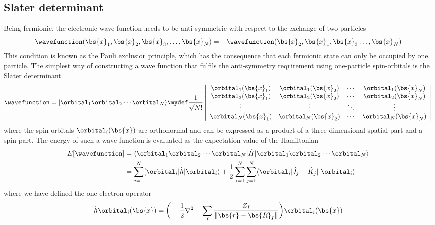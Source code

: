 \subsection{Slater determinant}
Being fermionic, the electronic wave function needs to be anti-symmetric with respect to 
the exchange of two particles
\begin{equation}
    \wavefunction(\bs{x}_1,\bs{x}_2,\bs{x}_3,\dots,\bs{x}_N) = -
    \wavefunction(\bs{x}_2,\bs{x}_1,\bs{x}_3\dots,\bs{x}_N)
\end{equation}
This condition is known as the Pauli exclusion principle\cite{Pauli_princ}, which has the 
consequence that each fermionic state can only be occupied by one particle. The simplest way
of constructing a wave function that fulfils the anti-symmetry requirement using one-particle
spin-orbitals is the Slater determinant\cite{slater}
\begin{equation}
    \begin{split}
    \wavefunction = |\orbital_1\orbital_2\cdots\orbital_N\rangle \mydef \frac{1}{\sqrt{N!}} 
    \left|
    \begin{array}{cccc}
	\orbital_1(\bs{x}_1)	& \orbital_1(\bs{x}_2)	& \cdots & \orbital_1(\bs{x}_N)\\
	\orbital_2(\bs{x}_1)	& \orbital_2(\bs{x}_2)	& \cdots & \orbital_2(\bs{x}_N)\\
	\vdots			& \vdots		& \ddots & \vdots\\
	\orbital_N(\bs{x}_1)	& \orbital_N(\bs{x}_2)	& \cdots & \orbital_N(\bs{x}_N)
    \end{array}
    \right|
    \end{split}
\end{equation}
where the spin-orbitals $\orbital_i(\bs{x})$ are orthonormal and can be expressed as a product 
of a three-dimensional spatial part and a spin part. The energy of such a wave function is 
evaluated as the expectation value of the Hamiltonian
\begin{align}
    E[\wavefunction] 
	&= \langle\orbital_1\orbital_2\cdots\orbital_N|\hat{H}|
	\orbital_1\orbital_2\cdots\orbital_N\rangle\\
	&= \sum_{i=1}^N \langle \orbital_i |\hat{h}| \orbital_i \rangle +
	\frac{1}{2} \sum_{i=1}^N \sum_{j=1}^N
	\langle \orbital_i |\hat{J}_j-\hat{K}_j| \orbital_i\rangle
\end{align}
where we have defined the one-electron operator
\begin{equation}
    \hat{h}\orbital_i(\bs{x}) = \bigg(-\frac{1}{2}\nabla^2 - \sum_I\frac{Z_I}{\|\bs{r}-\bs{R}_I\|}\bigg)
	\orbital_i(\bs{x})
\end{equation}
